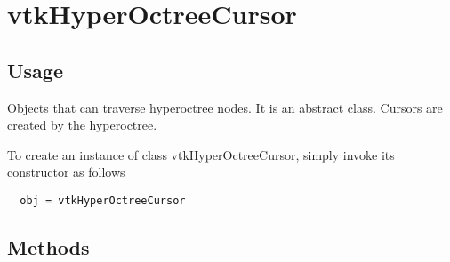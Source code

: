 \section{vtkHyperOctreeCursor}

\subsection{Usage}

 Objects that can traverse hyperoctree nodes. It is an abstract class.
 Cursors are created by the hyperoctree.

To create an instance of class vtkHyperOctreeCursor, simply
invoke its constructor as follows
\begin{verbatim}
  obj = vtkHyperOctreeCursor
\end{verbatim}
\subsection{Methods}

